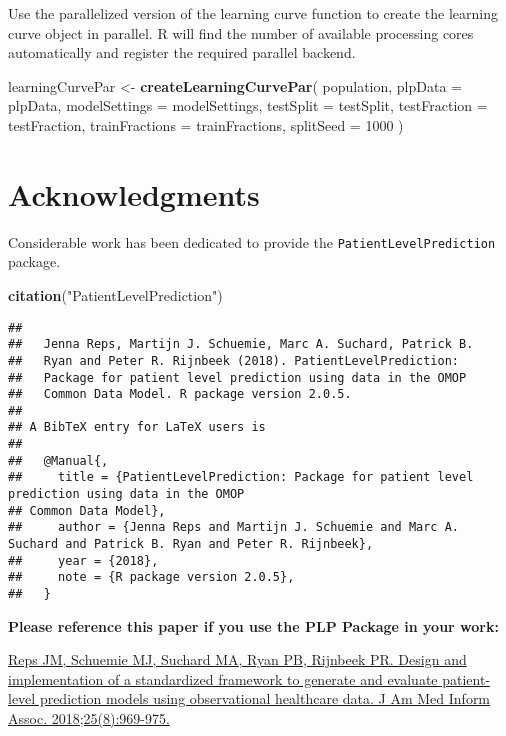 \documentclass[]{article}
\newenvironment{Shaded}{\begin{snugshade}}{\end{snugshade}}
\newcommand{\KeywordTok}[1]{\textcolor[rgb]{0.13,0.29,0.53}{\textbf{#1}}}
\newcommand{\DataTypeTok}[1]{\textcolor[rgb]{0.13,0.29,0.53}{#1}}
\newcommand{\DecValTok}[1]{\textcolor[rgb]{0.00,0.00,0.81}{#1}}
\newcommand{\StringTok}[1]{\textcolor[rgb]{0.31,0.60,0.02}{#1}}
\newcommand{\NormalTok}[1]{#1}
\begin{document}
Use the parallelized version of the learning curve function to create
the learning curve object in parallel. R will find the number of
available processing cores automatically and register the required
parallel backend.

\begin{Shaded}
\begin{Highlighting}[]
\NormalTok{learningCurvePar <-}\StringTok{ }\KeywordTok{createLearningCurvePar}\NormalTok{(}
\NormalTok{  population,}
  \DataTypeTok{plpData =}\NormalTok{  plpData,}
  \DataTypeTok{modelSettings =}\NormalTok{ modelSettings,}
  \DataTypeTok{testSplit =}\NormalTok{ testSplit,}
  \DataTypeTok{testFraction =}\NormalTok{ testFraction,}
  \DataTypeTok{trainFractions =}\NormalTok{ trainFractions,}
  \DataTypeTok{splitSeed =} \DecValTok{1000}
\NormalTok{)}
\end{Highlighting}
\end{Shaded}

\section{Acknowledgments}\label{acknowledgments}

Considerable work has been dedicated to provide the
\texttt{PatientLevelPrediction} package.

\begin{Shaded}
\begin{Highlighting}[]
\KeywordTok{citation}\NormalTok{(}\StringTok{"PatientLevelPrediction"}\NormalTok{)}
\end{Highlighting}
\end{Shaded}

\begin{verbatim}
## 
##   Jenna Reps, Martijn J. Schuemie, Marc A. Suchard, Patrick B.
##   Ryan and Peter R. Rijnbeek (2018). PatientLevelPrediction:
##   Package for patient level prediction using data in the OMOP
##   Common Data Model. R package version 2.0.5.
## 
## A BibTeX entry for LaTeX users is
## 
##   @Manual{,
##     title = {PatientLevelPrediction: Package for patient level prediction using data in the OMOP
## Common Data Model},
##     author = {Jenna Reps and Martijn J. Schuemie and Marc A. Suchard and Patrick B. Ryan and Peter R. Rijnbeek},
##     year = {2018},
##     note = {R package version 2.0.5},
##   }
\end{verbatim}

\textbf{Please reference this paper if you use the PLP Package in your
work:}

\href{http://dx.doi.org/10.1093/jamia/ocy032}{Reps JM, Schuemie MJ,
Suchard MA, Ryan PB, Rijnbeek PR. Design and implementation of a
standardized framework to generate and evaluate patient-level prediction
models using observational healthcare data. J Am Med Inform Assoc.
2018;25(8):969-975.}
\end{document}
